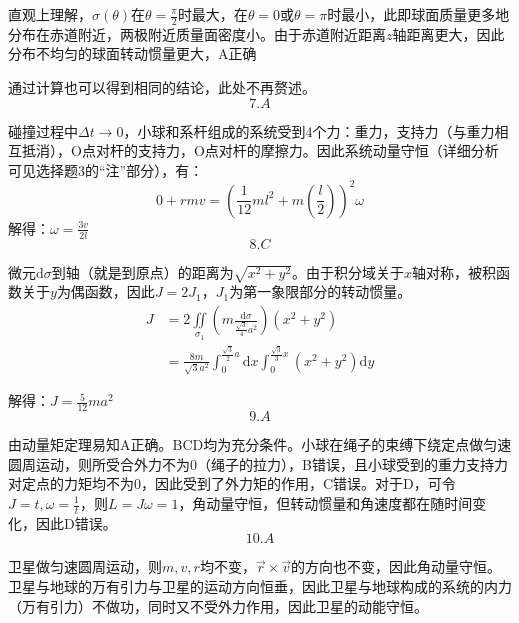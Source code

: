 \documentclass[b5paper,opensource]{./template/qyxf-book}
\newcommand{\di}[1]{\mathrm{d}#1}
\newcommand{\zbj}[4]
{
	\draw (0,0) node[below left] {$ O $};
	\draw [->] (#1,0) -- (#2,0) node[right] {$ x $};
	\draw [->] (0,#3) -- (0,#4) node[right] {$ y $};
}
\begin{document}
		直观上理解，$ \sigma(\theta) $在$ \theta=\frac{\pi}{2} $时最大，在$ \theta=0 $或$ \theta=\pi $时最小，此即球面质量更多地分布在赤道附近，两极附近质量面密度小。由于赤道附近距离$ z $轴距离更大，因此分布不均匀的球面转动惯量更大，A正确\par
		通过计算也可以得到相同的结论，此处不再赘述。
		\[7.A\]\par
		碰撞过程中$ \Delta t\to 0 $，小球和系杆组成的系统受到4个力：重力，支持力（与重力相互抵消），O点对杆的支持力，O点对杆的摩擦力。因此系统动量守恒（详细分析可见选择题3的“注”部分），有：
		\[0+rmv=(\frac{1}{12}ml^2+m\left(\frac{l}{2}\right))^2\omega\]
		解得：$\omega=\frac{3v}{2l}$
		\[8.C\]\par
		\par
		微元$ \di{\sigma} $到轴（就是到原点）的距离为$ \sqrt{x^2+y^2} $。由于积分域关于$ x $轴对称，被积函数关于$ y $为偶函数，因此$ J=2J_1$，$ J_1 $为第一象限部分的转动惯量。
		\begin{align*}
		J&=2\iint\limits_{\sigma_1}\left(m\frac{\di{\sigma}}{\frac{\sqrt{3}}{4}a^2}\right)(x^2+y^2)\\
		&=\frac{8m}{\sqrt{3}a^2}\int_0^{\frac{\sqrt{3}}{2}a}\di{x}\int_0^{\frac{\sqrt{3}}{3}x}(x^2+y^2)\di{y}
		\end{align*}\par
		解得：$ J=\frac{5}{12}ma^2 $
		\[9.A\]\par
		由动量矩定理易知A正确。BCD均为充分条件。小球在绳子的束缚下绕定点做匀速圆周运动，则所受合外力不为0（绳子的拉力），B错误，且小球受到的重力支持力对定点的力矩均不为0，因此受到了外力矩的作用，C错误。对于D，可令$ J=t,\omega=\frac{1}{t} $，则$ L=J\omega=1 $，角动量守恒，但转动惯量和角速度都在随时间变化，因此D错误。
		\[10.A\]\par
		卫星做匀速圆周运动，则$ m,v,r $均不变，$ \vec{r}\times\vec{v} $的方向也不变，因此角动量守恒。卫星与地球的万有引力与卫星的运动方向恒垂，因此卫星与地球构成的系统的内力（万有引力）不做功，同时又不受外力作用，因此卫星的动能守恒。
\end{document}
